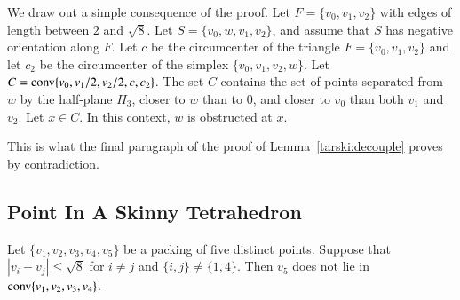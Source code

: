 \begin{tarskidata}
\begin{tarski}

\begin{lemma}
We draw out a simple consequence of the proof.
Let
$F=\{v_0,v_1,v_2\}$ with edges of length between $2$ and $\sqrt8$.
Let $S=\{v_0,w,v_1,v_2\}$, and assume that $S$ has negative
orientation along $F$. Let $c$ be the circumcenter of the triangle
$F=\{v_0,v_1,v_2\}$ and let $c_2$ be the circumcenter of the simplex
$\{v_0,v_1,v_2,w\}$. Let
$C={\operatorname{conv}}\{v_0,v_1/2,v_2/2,c,c_2\}$.  The set $C$ contains the set of points
separated from $w$ by the half-plane $H_3$, closer to $w$ than to
$0$, and closer to $v_0$ than both $v_1$ and $v_2$. Let $x\in C$.
In this context, $w$ is obstructed at $x$.
\end{lemma}

\begin{proved} This is what the final paragraph of the  proof of Lemma~\ref{tarski:decouple} proves by contradiction.
\swallowed\end{proved}
\end{tarski}










\begin{tarski}
\section{Point In A Skinny Tetrahedron}

\begin{lemma} 
Let 
$\{v_1,v_2,v_3,v_4,v_5\}$ be a packing of
five distinct points.  Suppose that $|v_i-v_j|\le
\sqrt8$ for $i\ne j$ and $\{i,j\}\ne\{1,4\}$. Then $v_5$ does not lie
in ${\operatorname{conv}}\{v_1,v_2,v_3,v_4\}$.
\end{lemma}


\end{tarski}
\end{tarskidata}
